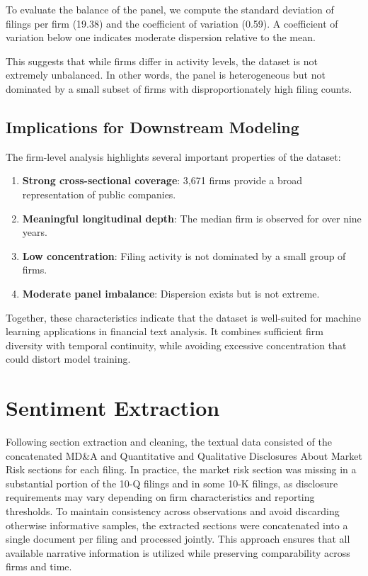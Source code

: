 To evaluate the balance of the panel, we compute the standard deviation of filings per firm (19.38) and the coefficient of variation (0.59). A coefficient of variation below one indicates moderate dispersion relative to the mean.

This suggests that while firms differ in activity levels, the dataset is not extremely unbalanced. In other words, the panel is heterogeneous but not dominated by a small subset of firms with disproportionately high filing counts.

\subsection*{Implications for Downstream Modeling}

The firm-level analysis highlights several important properties of the dataset:

\begin{enumerate}
    \item \textbf{Strong cross-sectional coverage}: 3,671 firms provide a broad representation of public companies.
    \item \textbf{Meaningful longitudinal depth}: The median firm is observed for over nine years.
    \item \textbf{Low concentration}: Filing activity is not dominated by a small group of firms.
    \item \textbf{Moderate panel imbalance}: Dispersion exists but is not extreme.
\end{enumerate}

Together, these characteristics indicate that the dataset is well-suited for machine learning applications in financial text analysis. It combines sufficient firm diversity with temporal continuity, while avoiding excessive concentration that could distort model training.

\section{Sentiment Extraction}

Following section extraction and cleaning, the textual data consisted of the concatenated MD\&A and Quantitative and Qualitative Disclosures About Market Risk sections for each filing. 
In practice, the market risk section was missing in a substantial portion of the 10-Q filings and in some 10-K filings, as disclosure requirements may vary depending on firm characteristics and reporting thresholds. 
To maintain consistency across observations and avoid discarding otherwise informative samples, the extracted sections were concatenated into a single document per filing and processed jointly. 
This approach ensures that all available narrative information is utilized while preserving comparability across firms and time.

